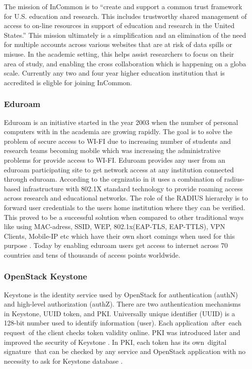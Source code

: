      The mission of InCommon is to ``create and support a common trust
     framework for U.S. education and research.  This includes
     trustworthy shared management of access to on-line resources in
     support of education and research in the United
     States.'' \cite{www-incommon} This mission ultimately is a
     simplification and an elimination of the need for multiple
     accounts across various websites that are at risk of data spills
     or misuse.  In the academic setting, this helps assist
     researchers to focus on their area of study, and enabling the
     cross collaboration which is happening on a globa scale.
     Currently any two and four year higher education institution that
     is accredited is eligble for joining InCommon.

\subsubsection{Eduroam \cite{www-eduroam}}

     Eduroam is an initiative started in the year 2003 when the number
     of personal computers with in the academia are growing
     rapidly. The goal is to solve the problem of secure access to
     WI-FI due to increasing number of students and research teams
     becoming mobile which was increasing the administrative problems
     for provide access to WI-FI. Eduroam provides any user from an
     eduroam participating site to get network access at any
     institution connected through eduroam. According to the
     orgnizatio in it uses a combination of radius-based infrastructure
     with 802.1X standard technology to provide roaming access across
     research and educational networks. The role of the RADIUS
     hierarchy is to forward user credentials to the users home
     institution where they can be verified. This proved to be a
     successful solution when compared to other traditional ways like
     using MAC-adress, SSID, WEP, 802.1x(EAP-TLS, EAP-TTLS), VPN
     Clients, Mobile-IP etc which have their own short comings when
     used for this purpose \cite{eduroam-paper-2005}. Today by
     enabling eduroam users get access to internet across 70 countries
     and tens of thousands of access points worldwide.


\subsubsection{OpenStack Keystone}

     \cite{www-keystone-wiki} Keystone is the identity service used
     by OpenStack for authentication (authN) and high-level
     authorization (authZ).  There are two authentication mechanisms
     in Keystone, UUID token, and PKI.  Universally unique identifier
     (UUID) is a 128-bit number used to identify information
     (user). Each application after each request of the client checks
     token validity online. PKI was introduced later and improved the
     security of Keystone \cite{cui2015security}. In PKI, each token
     has its own digital signature that can be checked by any service
     and OpenStack application with no necessity to ask for Keystone
     database \cite{www-cloudberrylab-kstn}.
 
